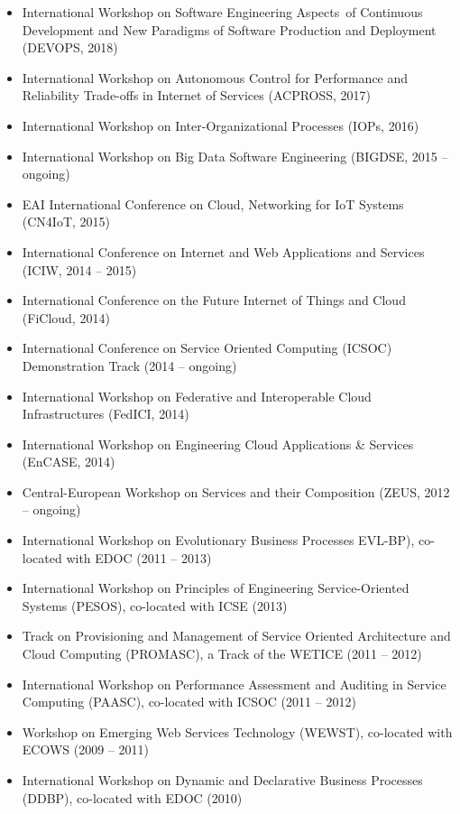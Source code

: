 \documentclass[paper=letter,fontsize=11pt]{scrartcl} %
\begin{document}
\begin{itemize}
	\item International Workshop on Software Engineering Aspects of Continuous Development and New Paradigms of Software Production and Deployment (DEVOPS, 2018)
  \item International Workshop on Autonomous Control for Performance and Reliability Trade-offs in Internet of Services (ACPROSS, 2017)
	\item International Workshop on Inter-Organizational Processes (IOPs, 2016)
    \item  International Workshop on Big Data Software Engineering (BIGDSE, 2015 -- ongoing)
  \item EAI International Conference on Cloud, Networking for IoT Systems (CN4IoT, 2015)
  \item International Conference on Internet and Web Applications and Services (ICIW, 2014 -- 2015)
  \item International Conference on the Future Internet of Things and Cloud (FiCloud, 2014)
    \item International Conference on Service Oriented Computing (ICSOC) Demonstration Track (2014 -- ongoing)
    \item International Workshop on Federative and Interoperable Cloud Infrastructures (FedICI, 2014)
    \item International Workshop on Engineering Cloud Applications \& Services (EnCASE, 2014)
  \item Central-European Workshop on Services and their Composition (ZEUS, 2012 -- ongoing)
  \item International Workshop on Evolutionary Business Processes EVL-BP), co-located with EDOC (2011 -- 2013)
  \item International Workshop on Principles of Engineering Service-Oriented Systems (PESOS), co-located with ICSE (2013)
  \item Track on Provisioning and Management of Service Oriented Architecture and Cloud Computing (PROMASC), a Track of the WETICE (2011 -- 2012)
  \item International Workshop on Performance Assessment and Auditing in Service Computing (PAASC), co-located with ICSOC (2011 -- 2012)
  \item Workshop on Emerging Web Services Technology (WEWST), co-located
  with ECOWS (2009 -- 2011)
  \item International Workshop on Dynamic and Declarative Business
  Processes (DDBP), co-located with EDOC (2010)
\end{itemize}
\end{document}
